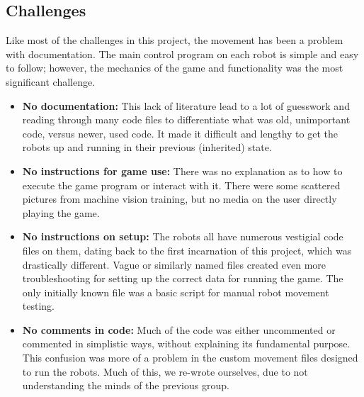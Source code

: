 \documentclass[a4paper,12pt]{article}
\begin{document}
\subsection{Challenges}
	Like most of the challenges in this project, the movement has been a problem with documentation. The main control program on each robot is simple and easy to follow; however, the mechanics of the game and functionality was the most significant challenge. 
	\begin{itemize}
	\item \textbf{No documentation:} This lack of literature lead to a lot of guesswork and reading through many code files to differentiate what was old, unimportant code, versus newer, used code. It made it difficult and lengthy to get the robots up and running in their previous (inherited) state.
	\item \textbf{No instructions for game use:} There was no explanation as to how to execute the game program or interact with it. There were some scattered pictures from machine vision training, but no media on the user directly playing the game.
	\item \textbf{No instructions on setup:} The robots all have numerous vestigial code files on them, dating back to the first incarnation of this project, which was drastically different. Vague or similarly named files created even more troubleshooting for setting up the correct data for running the game. The only initially known file was a basic script for manual robot movement testing.
	\item \textbf{No comments in code:} Much of the code was either uncommented or commented in simplistic ways, without explaining its fundamental purpose. This confusion was more of a problem in the custom movement files designed to run the robots. Much of this, we re-wrote ourselves, due to not understanding the minds of the previous group.
	\end{itemize}
	
\end{document}
